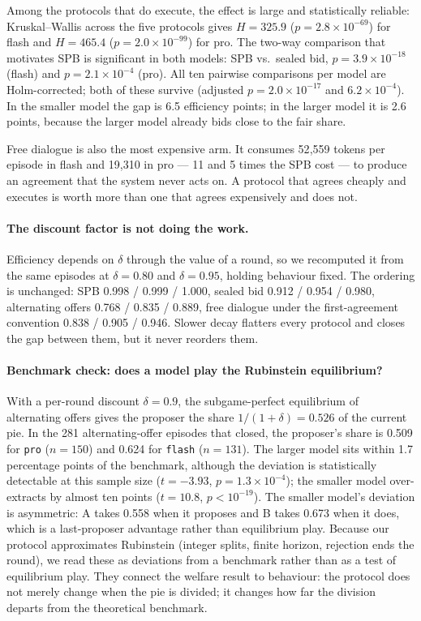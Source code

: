 \documentclass[11pt]{article}
\begin{document}
Among the protocols that do execute, the effect is large and statistically reliable: Kruskal--Wallis across the five protocols gives $H=325.9$ ($p=2.8\times10^{-69}$) for flash and $H=465.4$ ($p=2.0\times10^{-99}$) for pro. The two-way comparison that motivates SPB is significant in both models: SPB vs.\ sealed bid, $p=3.9\times10^{-18}$ (flash) and $p=2.1\times10^{-4}$ (pro). All ten pairwise comparisons per model are Holm-corrected; both of these survive (adjusted $p=2.0\times10^{-17}$ and $6.2\times10^{-4}$). In the smaller model the gap is 6.5 efficiency points; in the larger model it is 2.6 points, because the larger model already bids close to the fair share.

Free dialogue is also the most expensive arm. It consumes 52{,}559 tokens per episode in flash and 19{,}310 in pro --- 11 and 5 times the SPB cost --- to produce an agreement that the system never acts on. A protocol that agrees cheaply and executes is worth more than one that agrees expensively and does not.

\paragraph{The discount factor is not doing the work.}
Efficiency depends on $\delta$ through the value of a round, so we recomputed it from the same episodes at $\delta=0.80$ and $\delta=0.95$, holding behaviour fixed. The ordering is unchanged: SPB 0.998 / 0.999 / 1.000, sealed bid 0.912 / 0.954 / 0.980, alternating offers 0.768 / 0.835 / 0.889, free dialogue under the first-agreement convention 0.838 / 0.905 / 0.946. Slower decay flatters every protocol and closes the gap between them, but it never reorders them.

\paragraph{Benchmark check: does a model play the Rubinstein equilibrium?}
With a per-round discount $\delta=0.9$, the subgame-perfect equilibrium of alternating offers gives the proposer the share $1/(1+\delta)=0.526$ of the current pie. In the 281 alternating-offer episodes that closed, the proposer's share is 0.509 for \texttt{pro} ($n=150$) and 0.624 for \texttt{flash} ($n=131$). The larger model sits within 1.7 percentage points of the benchmark, although the deviation is statistically detectable at this sample size ($t=-3.93$, $p=1.3\times10^{-4}$); the smaller model over-extracts by almost ten points ($t=10.8$, $p<10^{-19}$). The smaller model's deviation is asymmetric: A takes 0.558 when it proposes and B takes 0.673 when it does, which is a last-proposer advantage rather than equilibrium play. Because our protocol approximates Rubinstein (integer splits, finite horizon, rejection ends the round), we read these as deviations from a benchmark rather than as a test of equilibrium play. They connect the welfare result to behaviour: the protocol does not merely change when the pie is divided; it changes how far the division departs from the theoretical benchmark.
\end{document}
